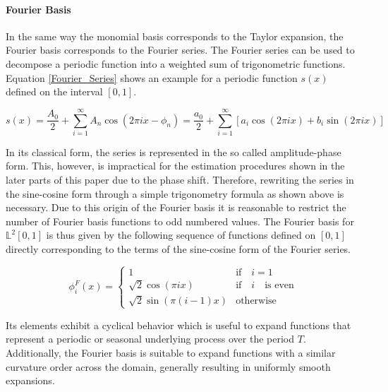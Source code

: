 \documentclass[11pt,twoside,a4paper]{article}
\begin{document}
	\paragraph{Fourier Basis}
	In the same way the monomial basis corresponds to the Taylor expansion, the Fourier basis corresponds to the Fourier series. The Fourier series can be used to decompose a periodic function into a weighted sum of trigonometric functions. Equation \ref{Fourier_Series} shows an example for a periodic function $s(x)$ defined on the interval $[0,1]$.
	
	\begin{equation}\label{Fourier_Series}
		s(x) = \frac{A_0}{2} + \sum_{i = 1}^{\infty} A_n \cos(2\pi i x - \phi_n) = \frac{a_0}{2} + \sum_{i = 1}^{\infty}\left[a_i \cos(2\pi i x) + b_i \sin(2\pi i x)\right]
	\end{equation}
	
	In its classical form, the series is represented in the so called amplitude-phase form. This, however, is impractical for the estimation procedures shown in the later parts of this paper due to the phase shift. Therefore, rewriting the series in the sine-cosine form through a simple trigonometry formula as shown above is necessary. Due to this origin of the Fourier basis it is reasonable to restrict the number of Fourier basis functions to odd numbered values.
	The Fourier basis for $\mathbb{L}^2[0,1]$ is thus given by the following sequence of functions defined on $[0,1]$ directly corresponding to the terms of the sine-cosine form of the Fourier series.
	
	\begin{equation}
		\phi_{i}^{F}(x) = 
		\begin{cases}
			1 & \text{if} \quad i = 1\\
			\sqrt{2} \cos(\pi i x) & \text{if} \quad i \quad \text{is even} \\
			\sqrt{2} \sin(\pi (i-1)x) & \text{otherwise}
		\end{cases}
	\end{equation}

	Its elements exhibit a cyclical behavior which is useful to expand functions that represent a periodic or seasonal underlying process over the period $T$. Additionally, the Fourier basis is suitable to expand functions with a similar curvature order across the domain, generally resulting in uniformly smooth expansions.
	
\end{document}
